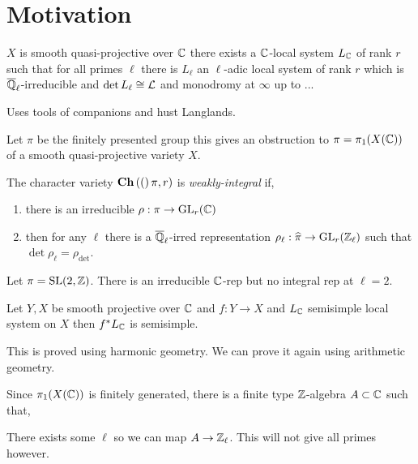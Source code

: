 \documentclass[12pt]{article}
\newcommand{\Qbar}{\overline{\Q}}
\begin{document}
\section{Motivation}

\begin{theorem}
$X$ is smooth quasi-projective over $\mathbb{C}$ there exists a $\mathbb{C}$-local system $L_{\mathbb{C}}$ of rank $r$ such that for all primes $\ell$ there is $L_{\ell}$ an $\ell$-adic local system of rank $r$ which is $\Qbar_\ell$-irreducible and $\det{L_{\ell}} \cong \mathcal{L}$ and monodromy at $\infty$ up to ... 
\end{theorem}

Uses tools of companions and hust Langlands. 

\begin{rmk}
Let $\pi$ be the finitely presented group this gives an obstruction to $\pi = \pi_1(X(\mathbb{C}))$ of a smooth quasi-projective variety $X$. 
\end{rmk}

\begin{defn}
The character variety $\mathbf{Ch}\left( ( \right)\pi, r)$ is \textit{weakly-integral} if,
\begin{enumerate}
\item there is an irreducible $\rho : \pi \to \mathrm{GL}_r(\mathbb{C})$ 
\item then for any $\ell$ there is a $\Qbar_\ell$-irred representation $\rho_{\ell} : \widehat{\pi} \to \mathrm{GL}_r(\mathbb{Z}_\ell)$ such that $\det{\rho_{\ell}} = \rho_{\det}$.
\end{enumerate}
\end{defn}

\begin{example}
Let $\pi = \mathrm{SL}(2, \mathbb{Z})$. There is an irreducible $\mathbb{C}$-rep but no integral rep at $\ell = 2$.
\end{example}

\begin{theorem}
Let $Y, X$ be smooth projective over $\mathbb{C}$ and $f : Y \to X$ and $L_{\mathbb{C}}$ semisimple local system on $X$ then $f^* L_{\mathbb{C}}$ is semisimple. 
\end{theorem}

\begin{rmk}
This is proved using harmonic geometry. We can prove it again using arithmetic geometry. 
\end{rmk}

\begin{rmk}
Since $\pi_1(X(\mathbb{C}))$ is finitely generated, there is a finite type $\mathbb{Z}$-algebra $A \subset \mathbb{C}$ such that,
\begin{center}
\end{center}
There exists some $\ell$ so we can map $A \to \mathbb{Z}_\ell$. This will not give all primes however. 
\end{rmk}
\end{document}
